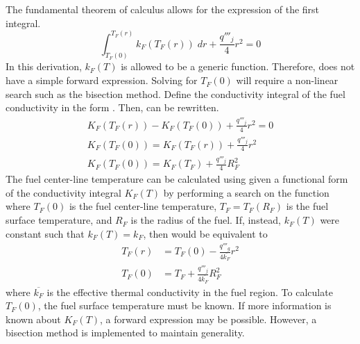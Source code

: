       The fundamental theorem of calculus allows for the expression of the first
      integral.
      \begin{equation}
        \label{eq:tcl_integral}
        \int_{T_F(0)}^{T_F(r)} k_F(T_F(r)) \; dr + \frac{q'''_j}{4} r^2 = 0
      \end{equation}
      In this derivation, $k_F(T)$ is allowed to be a generic function. 
      Therefore,  does not have a simple forward 
      expression. Solving for $T_F(0)$ will require a non-linear search such as
      the bisection method. Define the conductivity integral of the fuel
      conductivity in the form .
      Then,  can be rewritten.
      \begin{gather}
        K_F(T_F(r)) - K_F(T_F(0)) + \frac{q'''_j}{4} r^2 = 0 \\
        \label{eq:tfuel_r}
        K_F(T_F(0)) = K_F(T_F(r)) + \frac{q'''_j}{4} r^2 \\
        \label{eq:tcl_conductivity_integral}
        K_F(T_F(0)) = K_F(T_F) + \frac{q'''_j}{4} R_F^2
      \end{gather}
      The fuel center-line temperature can be calculated using
       given a functional form of the
      conductivity integral $K_F(T)$ by performing a search on the function
      where $T_F(0)$ is the fuel center-line temperature, $T_F=T_F(R_F)$ is the
      fuel surface temperature, and $R_F$ is the radius of the fuel.
      If, instead, $k_F(T)$ were constant such that $k_F(T) = k_F$, then
       would be equivalent to 
      \begin{align}
        \label{eq:tfr}
        T_F(r) &= T_F(0) - \frac{q'''_g}{4 \overline{k_F}} r^2 \\
        \label{eq:tcl_constant_kfuel}
        T_F(0) &= T_F + \frac{q'''_j}{4 \overline{k_F}} R_F^2
      \end{align}
      where $\overline{k_F}$ is the effective thermal conductivity in the fuel
      region.
      To calculate $T_F(0)$, the fuel surface temperature must be known.
      If more information is known about $K_F(T)$, a forward expression
      may be possible. However, a bisection method is implemented to maintain
      generality.

